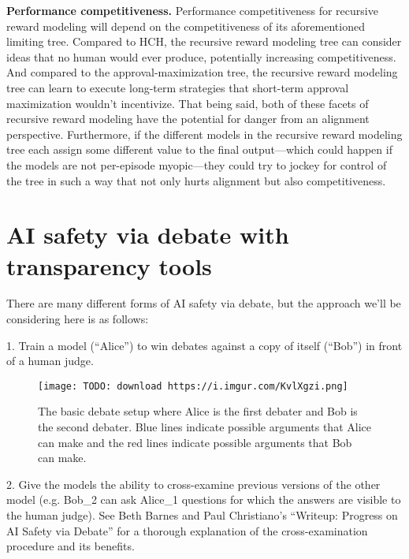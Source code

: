 \textbf{Performance competitiveness.} Performance competitiveness for recursive reward modeling will depend on the competitiveness of its aforementioned limiting tree. Compared to HCH, the recursive reward modeling tree can consider ideas that no human would ever produce, potentially increasing competitiveness. And compared to the approval-maximization tree, the recursive reward modeling tree can learn to execute long-term strategies that short-term approval maximization wouldn't incentivize. That being said, both of these facets of recursive reward modeling have the potential for danger from an alignment perspective. Furthermore, if the different models in the recursive reward modeling tree each assign some different value to the final output---which could happen if the models are not per-episode myopic---they could try to jockey for control of the tree in such a way that not only hurts alignment but also competitiveness.

\section{AI safety via debate with transparency tools}
\label{sec:9}

There are many different forms of AI safety via debate\cite{TODO: cite https://arxiv.org/abs/1805.00899}, but the approach we'll be considering here is as follows:

1. Train a model (``Alice'') to win debates against a copy of itself (``Bob'') in front of a human judge.

\begin{figure}[h!]
  \centering
  \texttt{[image: TODO: download https://i.imgur.com/KvlXgzi.png]}
  \caption{The basic debate setup where Alice is the first debater and Bob is the second debater. Blue lines indicate possible arguments that Alice can make and the red lines indicate possible arguments that Bob can make.}
\end{figure}

2. Give the models the ability to cross-examine previous versions of the other model (e.g. Bob_2 can ask Alice_1 questions for which the answers are visible to the human judge). See Beth Barnes and Paul Christiano's ``Writeup: Progress on AI Safety via Debate\cite{TODO: cite https://www.alignmentforum.org/posts/Br4xDbYu4Frwrb64a/writeup-progress-on-ai-safety-via-debate-1}'' for a thorough explanation of the cross-examination procedure and its benefits.

